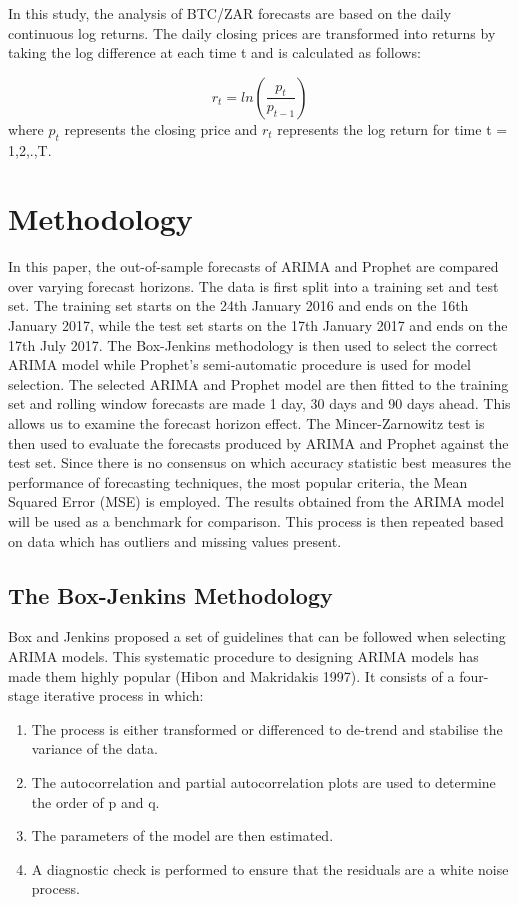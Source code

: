 \documentclass[12pt,a4paper]{article}
\numberwithin{equation}{section}
\numberwithin{figure}{section}
\numberwithin{table}{section}
\begin{document}
In this study, the analysis of BTC/ZAR forecasts are based on the daily
continuous log returns. The daily closing prices are transformed into
returns by taking the log difference at each time t and is calculated as
follows:

\[ r_t = ln(\frac{p_t}{p_{t-1}}) \] where \(p_t\) represents the closing
price and \(r_t\) represents the log return for time t = 1,2,.,T.

\section{\texorpdfstring{Methodology
\label{Methodology}}{Methodology }}\label{methodology}

In this paper, the out-of-sample forecasts of ARIMA and Prophet are
compared over varying forecast horizons. The data is first split into a
training set and test set. The training set starts on the 24th January
2016 and ends on the 16th January 2017, while the test set starts on the
17th January 2017 and ends on the 17th July 2017. The Box-Jenkins
methodology is then used to select the correct ARIMA model while
Prophet's semi-automatic procedure is used for model selection. The
selected ARIMA and Prophet model are then fitted to the training set and
rolling window forecasts are made 1 day, 30 days and 90 days ahead. This
allows us to examine the forecast horizon effect. The Mincer-Zarnowitz
test is then used to evaluate the forecasts produced by ARIMA and
Prophet against the test set. Since there is no consensus on which
accuracy statistic best measures the performance of forecasting
techniques, the most popular criteria, the Mean Squared Error (MSE) is
employed. The results obtained from the ARIMA model will be used as a
benchmark for comparison. This process is then repeated based on data
which has outliers and missing values present.

\subsection{The Box-Jenkins
Methodology}\label{the-box-jenkins-methodology}

Box and Jenkins proposed a set of guidelines that can be followed when
selecting ARIMA models. This systematic procedure to designing ARIMA
models has made them highly popular (Hibon and Makridakis 1997). It
consists of a four-stage iterative process in which:

\begin{enumerate}
\def\labelenumi{\arabic{enumi}.}
\item
  The process is either transformed or differenced to de-trend and
  stabilise the variance of the data.
\item
  The autocorrelation and partial autocorrelation plots are used to
  determine the order of p and q.
\item
  The parameters of the model are then estimated.
\item
  A diagnostic check is performed to ensure that the residuals are a
  white noise process.
\end{enumerate}
\end{document}
